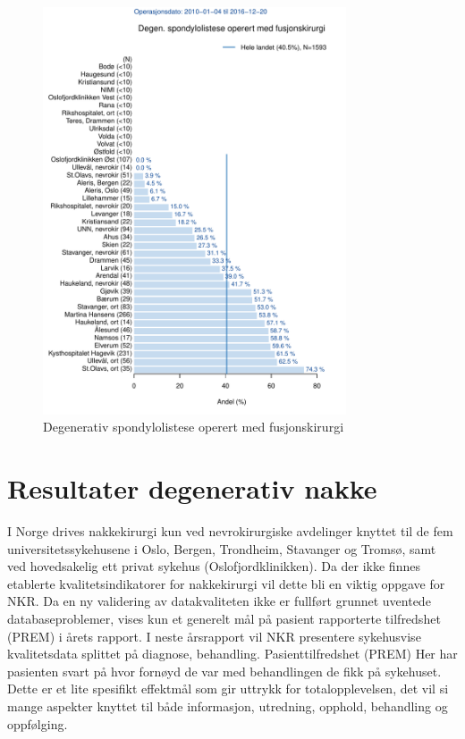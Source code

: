\documentclass [norsk,a4paper,twoside]{article}\usepackage[]{graphicx}\usepackage[]{color}
\begin{document}
\begin{figure}[ht]
\centering \includegraphics[width= 0.8\textwidth]{FigdegSponFusj.pdf}
\caption{\label{fig:Dura} Degenerativ spondylolistese operert med fusjonskirurgi}
\end{figure}



\clearpage

\section{Resultater degenerativ nakke}


I Norge drives nakkekirurgi kun ved nevrokirurgiske avdelinger knyttet til de fem
universitetssykehusene i Oslo, Bergen, Trondheim, Stavanger og Tromsø, samt ved
hovedsakelig ett privat sykehus (Oslofjordklinikken).
Da der ikke finnes etablerte kvalitetsindikatorer for nakkekirurgi vil dette bli en
viktig oppgave for NKR. Da en ny validering av datakvaliteten ikke er fullført grunnet
uventede databaseproblemer, vises kun et generelt mål på pasient rapporterte
tilfredshet (PREM) i årets rapport. I neste årsrapport vil NKR presentere sykehusvise
kvalitetsdata splittet på diagnose, behandling.
Pasienttilfredshet (PREM)
Her har pasienten svart på hvor fornøyd de var med behandlingen de fikk på
sykehuset. Dette er et lite spesifikt effektmål som gir uttrykk for totalopplevelsen,
det vil si mange aspekter knyttet til både informasjon, utredning, opphold,
behandling og oppfølging.
\end{document}
